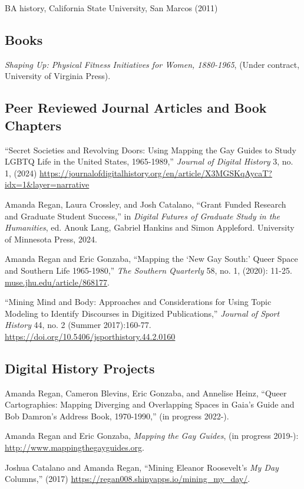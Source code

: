 \documentclass[11pt]{article}
\begin{document}
BA history, California State University, San Marcos (2011)

\subsection{Books}
\emph{Shaping Up: Physical Fitness Initiatives for Women, 1880-1965}, (Under contract, University of Virginia Press).

\subsection{Peer Reviewed Journal Articles and Book Chapters}\label{peer-reviewed}
``Secret Societies and Revolving Doors: Using Mapping the Gay Guides to Study LGBTQ Life in the United States, 1965-1989,'' \emph{Journal of Digital History} 3, no. 1, (2024) \url{https://journalofdigitalhistory.org/en/article/X3MGSKqAycaT?idx=1&layer=narrative}

Amanda Regan, Laura Crossley, and Josh Catalano, ``Grant Funded Research and Graduate Student Success,'' in \emph{Digital Futures of Graduate Study in the Humanities}, ed. Anouk Lang, Gabriel Hankins and Simon Appleford. University of Minnesota Press, 2024.

Amanda Regan and Eric Gonzaba, ``Mapping the `New Gay South:' Queer Space and Southern Life 1965-1980,'' \emph{The Southern Quarterly} 58, no. 1, (2020): 11-25. \url{muse.jhu.edu/article/868177}.

``Mining Mind and Body: Approaches and Considerations for Using Topic Modeling to Identify Discourses in Digitized Publications,'' \emph{Journal of Sport History} 44, no. 2 (Summer 2017):160-77. \url{https://doi.org/10.5406/jsporthistory.44.2.0160}

\subsection{Digital History Projects}

Amanda Regan, Cameron Blevins, Eric Gonzaba, and Annelise Heinz, ``Queer Cartographies: Mapping Diverging and Overlapping Spaces in Gaia's Guide and Bob Damron's Address Book, 1970-1990,'' (in progress 2022-).

Amanda Regan and Eric Gonzaba, \emph{Mapping the Gay Guides}, (in progress 2019-): \url{http://www.mappingthegayguides.org}.

Joshua Catalano and Amanda Regan, ``Mining Eleanor Roosevelt's \emph{My Day} Columns,'' (2017) \url{https://regan008.shinyapps.io/mining_my_day/}.
\end{document}
